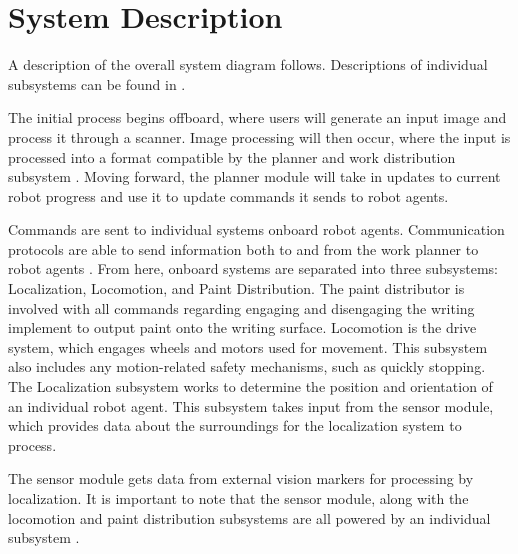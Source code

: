 
\section{System Description}
\label{sec:system_description}



A description of the overall system diagram follows. Descriptions of individual subsystems can be found in .

The initial process begins offboard, where users will generate an input image and process it through a scanner. Image processing will then occur, where the input is processed into a format compatible by the planner and work distribution subsystem . Moving forward, the planner module will take in updates to current robot progress and use it to update commands it sends to robot agents.

Commands are sent to individual systems onboard robot agents. Communication protocols are able to send information both to and from the work planner to robot agents . From here, onboard systems are separated into three subsystems: Localization, Locomotion, and Paint Distribution. The paint distributor is involved with all commands regarding engaging and disengaging the writing implement to output paint onto the writing surface. Locomotion is the drive system, which engages wheels and motors used for movement. This subsystem also includes any motion-related safety mechanisms, such as quickly stopping. The Localization subsystem works to determine the position and orientation of an individual robot agent. This subsystem takes input from the sensor module, which provides data about the surroundings for the localization system to process.

The sensor module gets data from external vision markers for processing by localization. It is important to note that the sensor module, along with the locomotion and paint distribution subsystems are all powered by an individual subsystem .